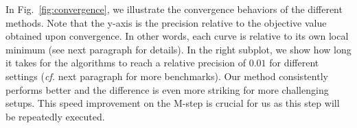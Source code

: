 In Fig.~\ref{fig:convergence}, we illustrate the convergence behaviors of the different methods.
Note that the y-axis is the precision relative to the objective value obtained upon convergence. In other words, each curve is relative to its own local minimum (see next paragraph for details).
In the right subplot, we show how long it takes for the algorithms to reach a relative precision of $0.01$ for different settings (\textit{cf.} next paragraph for more benchmarks). Our method consistently performs better and the difference is even more striking for more challenging setups. This speed improvement on the M-step is crucial for us as this step will be repeatedly executed. %
%
\newcommand{\tmpsize}{0.15}
